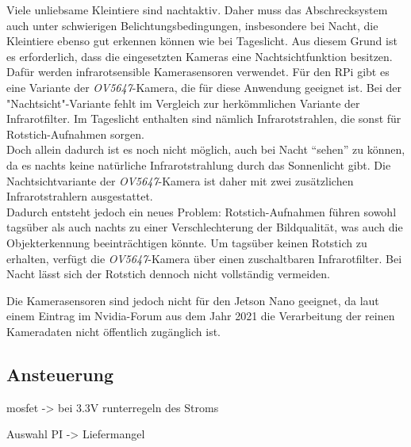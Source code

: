 Viele unliebsame Kleintiere sind nachtaktiv. Daher muss das Abschrecksystem auch unter schwierigen Belichtungsbedingungen, insbesondere bei Nacht, die Kleintiere ebenso gut erkennen können wie bei Tageslicht. Aus diesem Grund ist es erforderlich, dass die eingesetzten Kameras eine Nachtsichtfunktion besitzen. Dafür werden infrarotsensible Kamerasensoren verwendet. Für den \acl{RPi} gibt es eine Variante der \textit{OV5647}-Kamera, die für diese Anwendung geeignet ist. Bei der "Nachtsicht"-Variante fehlt im Vergleich zur herkömmlichen Variante der Infrarotfilter. Im Tageslicht enthalten sind nämlich Infrarotstrahlen, die sonst für Rotstich-Aufnahmen sorgen. 
\\
Doch allein dadurch ist es noch nicht möglich, auch bei Nacht "`sehen"' zu können, da es nachts keine natürliche Infrarotstrahlung durch das Sonnenlicht gibt. Die Nachtsichtvariante der \textit{OV5647}-Kamera ist daher mit zwei zusätzlichen Infrarotstrahlern ausgestattet.
\\
Dadurch entsteht jedoch ein neues Problem: Rotstich-Aufnahmen führen sowohl tagsüber als auch nachts zu einer Verschlechterung der Bildqualität, was auch die Objekterkennung beeinträchtigen könnte. Um tagsüber keinen Rotstich zu erhalten, verfügt die \textit{OV5647}-Kamera über einen zuschaltbaren Infrarotfilter. Bei Nacht lässt sich der Rotstich dennoch nicht vollständig vermeiden. \cite{ov_5647}

Die Kamerasensoren sind jedoch nicht für den Jetson Nano geeignet, da laut einem Eintrag im Nvidia-Forum aus dem Jahr 2021 die Verarbeitung der reinen Kameradaten nicht öffentlich zugänglich ist. \cite{nvidia_forum_2021_nvidia}
\\

\subsection{Ansteuerung}

mosfet -> bei 3.3V runterregeln des Stroms

Auswahl PI -> Liefermangel



